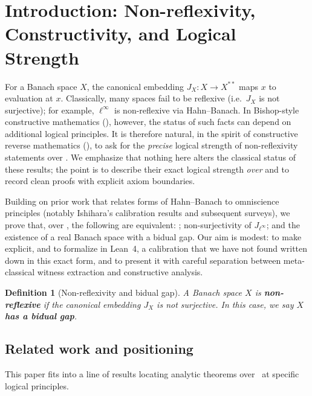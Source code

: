\documentclass[11pt]{article}
\newtheorem{definition}[theorem]{Definition}
\newcommand{\WLPO}{\mathrm{WLPO}}
\newcommand{\BISH}{\mathrm{BISH}}
\newcommand{\CRM}{\mathrm{CRM}}
\begin{document}
\tableofcontents

\section{Introduction: Non-reflexivity, Constructivity, and Logical Strength}

For a Banach space $X$, the canonical embedding $J_X:X\to X^{**}$ maps $x$ to evaluation at $x$. Classically, many spaces fail to be reflexive (i.e.\ $J_X$ is not surjective); for example, $\ell^\infty$ is non-reflexive via Hahn--Banach. In Bishop-style constructive mathematics (\BISH), however, the status of such facts can depend on additional logical principles. It is therefore natural, in the spirit of constructive reverse mathematics (\CRM), to ask for the \emph{precise} logical strength of non-reflexivity statements over \BISH. We emphasize that nothing here alters the classical status of these results; the point is to describe their exact logical strength \emph{over \BISH} and to record clean proofs with explicit axiom boundaries.

Building on prior work that relates forms of Hahn--Banach to omniscience principles (notably Ishihara's calibration results and subsequent surveys), we prove that, over \BISH, the following are equivalent: \WLPO; non-surjectivity of $J_{\ell^\infty}$; and the existence of a real Banach space with a bidual gap. Our aim is modest: to make explicit, and to formalize in Lean~4, a calibration that we have not found written down in this exact form, and to present it with careful separation between meta-classical witness extraction and constructive analysis.

\begin{definition}[Non-reflexivity and bidual gap]
A Banach space $X$ is \textbf{non-reflexive} if the canonical embedding $J_X$ is not surjective. In this case, we say $X$ \textbf{has a bidual gap}.
\end{definition}

\subsection{Related work and positioning}

This paper fits into a line of results locating analytic theorems over \BISH\ at specific logical principles.
\end{document}

